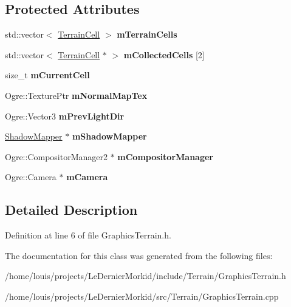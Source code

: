 \subsection*{Protected Attributes}
\begin{DoxyCompactItemize}
\item 
\mbox{\label{class_graphics_terrain_a7c44ecd3372c8fc18414b45e48cd08b4}} 
std\+::vector$<$ \hyperlink{class_terrain_cell}{Terrain\+Cell} $>$ {\bfseries m\+Terrain\+Cells}
\item 
\mbox{\label{class_graphics_terrain_a99431a62bb984a130be408d8e198f74e}} 
std\+::vector$<$ \hyperlink{class_terrain_cell}{Terrain\+Cell} $\ast$ $>$ {\bfseries m\+Collected\+Cells} \mbox{[}2\mbox{]}
\item 
\mbox{\label{class_graphics_terrain_a88383b43425ca55d6fbb5ef1e20302a3}} 
size\+\_\+t {\bfseries m\+Current\+Cell}
\item 
\mbox{\label{class_graphics_terrain_a7f43e03a4fe4c0811648b299397dc4da}} 
Ogre\+::\+Texture\+Ptr {\bfseries m\+Normal\+Map\+Tex}
\item 
\mbox{\label{class_graphics_terrain_aea152cbc9b9a33faed38e5fad97aa793}} 
Ogre\+::\+Vector3 {\bfseries m\+Prev\+Light\+Dir}
\item 
\mbox{\label{class_graphics_terrain_aeb60344dfe412f9241348c96fa29f9ec}} 
\hyperlink{class_shadow_mapper}{Shadow\+Mapper} $\ast$ {\bfseries m\+Shadow\+Mapper}
\item 
\mbox{\label{class_graphics_terrain_a80d73f6cdce5b43211188f6bda9fc633}} 
Ogre\+::\+Compositor\+Manager2 $\ast$ {\bfseries m\+Compositor\+Manager}
\item 
\mbox{\label{class_graphics_terrain_afd48f23d6b969ccef286bb1aec437340}} 
Ogre\+::\+Camera $\ast$ {\bfseries m\+Camera}
\end{DoxyCompactItemize}


\subsection{Detailed Description}


Definition at line 6 of file Graphics\+Terrain.\+h.



The documentation for this class was generated from the following files\+:\begin{DoxyCompactItemize}
\item 
/home/louis/projects/\+Le\+Dernier\+Morkid/include/\+Terrain/Graphics\+Terrain.\+h\item 
/home/louis/projects/\+Le\+Dernier\+Morkid/src/\+Terrain/Graphics\+Terrain.\+cpp\end{DoxyCompactItemize}
